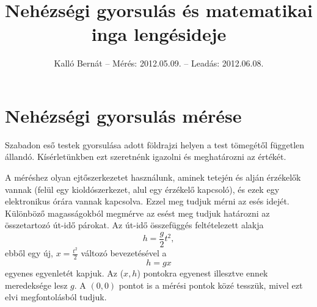 \documentclass[12pt]{article}
\title{Nehézségi gyorsulás és matematikai inga lengésideje}
\author{Kalló Bernát -- Mérés: 2012.05.09. -- Leadás: 2012.06.08.}
\date{}
\begin{document}
\def\tnagy{\ensuremath{t_{\text{nagy}}}}\def\tkicsi{\ensuremath{t_{\text{kicsi}}}}\def\xnagy{\ensuremath{x_{\text{nagy}}}}\def\xkicsi{\ensuremath{x_{\text{kicsi}}}}\def\gnagy{\ensuremath{g_{\text{nagy}}}}\def\gkicsi{\ensuremath{g_{\text{kicsi}}}}\def\Deltagnagy{\ensuremath{\Delta{}g_{\text{nagy}}}}\def\Deltagkicsi{\ensuremath{\Delta{}g_{\text{kicsi}}}}\def\geff{\ensuremath{g_\text{eff}}}

\maketitle

\section{Nehézségi gyorsulás mérése}

Szabadon eső testek gyorsulása adott földrajzi helyen a test tömegétől független állandó. Kísérletünkben ezt szeretnénk igazolni és meghatározni az értékét.

A méréshez olyan ejtőszerkezetet használunk, aminek tetején és alján érzékelők vannak (felül egy kioldószerkezet, alul egy érzékelő kapcsoló), és ezek egy elektronikus órára vannak kapcsolva. Ezzel meg tudjuk mérni az esés idejét. Különböző magasságokból megmérve az esést meg tudjuk határozni az összetartozó út-idő párokat. Az út-idő összefüggés feltételezett alakja \[h = \frac g2 t^2, \] ebből egy új, $x=\frac{t^2}{2}$ változó bevezetésével a \[h=gx\] egyenes egyenletét kapjuk. Az ($x,h$) pontokra egyenest illesztve ennek meredeksége lesz $g$. A $(0,0)$ pontot is a mérési pontok közé tesszük, mivel ezt elvi megfontolásból tudjuk.
\end{document}
